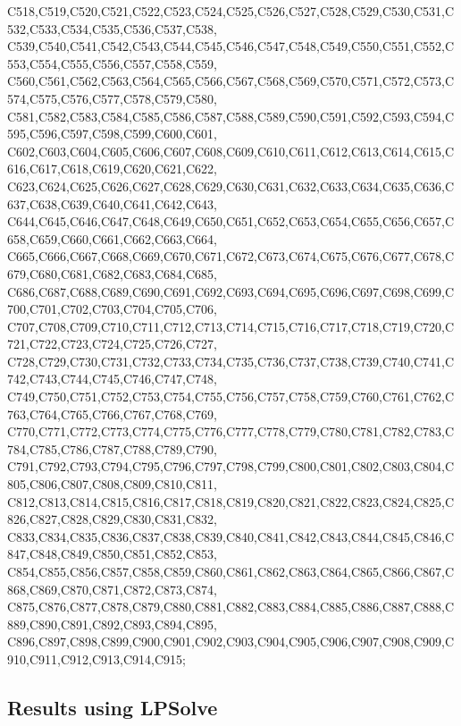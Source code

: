 C518,C519,C520,C521,C522,C523,C524,C525,C526,C527,C528,C529,C530,C531,C532,C533,C534,C535,C536,C537,C538,
C539,C540,C541,C542,C543,C544,C545,C546,C547,C548,C549,C550,C551,C552,C553,C554,C555,C556,C557,C558,C559,
C560,C561,C562,C563,C564,C565,C566,C567,C568,C569,C570,C571,C572,C573,C574,C575,C576,C577,C578,C579,C580,
C581,C582,C583,C584,C585,C586,C587,C588,C589,C590,C591,C592,C593,C594,C595,C596,C597,C598,C599,C600,C601,
C602,C603,C604,C605,C606,C607,C608,C609,C610,C611,C612,C613,C614,C615,C616,C617,C618,C619,C620,C621,C622,
C623,C624,C625,C626,C627,C628,C629,C630,C631,C632,C633,C634,C635,C636,C637,C638,C639,C640,C641,C642,C643,
C644,C645,C646,C647,C648,C649,C650,C651,C652,C653,C654,C655,C656,C657,C658,C659,C660,C661,C662,C663,C664,
C665,C666,C667,C668,C669,C670,C671,C672,C673,C674,C675,C676,C677,C678,C679,C680,C681,C682,C683,C684,C685,
C686,C687,C688,C689,C690,C691,C692,C693,C694,C695,C696,C697,C698,C699,C700,C701,C702,C703,C704,C705,C706,
C707,C708,C709,C710,C711,C712,C713,C714,C715,C716,C717,C718,C719,C720,C721,C722,C723,C724,C725,C726,C727,
C728,C729,C730,C731,C732,C733,C734,C735,C736,C737,C738,C739,C740,C741,C742,C743,C744,C745,C746,C747,C748,
C749,C750,C751,C752,C753,C754,C755,C756,C757,C758,C759,C760,C761,C762,C763,C764,C765,C766,C767,C768,C769,
C770,C771,C772,C773,C774,C775,C776,C777,C778,C779,C780,C781,C782,C783,C784,C785,C786,C787,C788,C789,C790,
C791,C792,C793,C794,C795,C796,C797,C798,C799,C800,C801,C802,C803,C804,C805,C806,C807,C808,C809,C810,C811,
C812,C813,C814,C815,C816,C817,C818,C819,C820,C821,C822,C823,C824,C825,C826,C827,C828,C829,C830,C831,C832,
C833,C834,C835,C836,C837,C838,C839,C840,C841,C842,C843,C844,C845,C846,C847,C848,C849,C850,C851,C852,C853,
C854,C855,C856,C857,C858,C859,C860,C861,C862,C863,C864,C865,C866,C867,C868,C869,C870,C871,C872,C873,C874,
C875,C876,C877,C878,C879,C880,C881,C882,C883,C884,C885,C886,C887,C888,C889,C890,C891,C892,C893,C894,C895,
C896,C897,C898,C899,C900,C901,C902,C903,C904,C905,C906,C907,C908,C909,C910,C911,C912,C913,C914,C915;


\subsection{Results using LPSolve}

